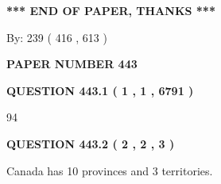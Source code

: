 \documentclass[12pt]{article}
\begin{document}
 
 
 
   
   
 \vspace{0.2in}
 
   
   
   
   
\vspace{1.0in} 
{\textbf{\large{ *** END OF PAPER, THANKS *** }}} 
   
   
\hspace{1.0in} By: 
 239 ( 416 ,  613 )
   
   
   
   
\newpage 
\setcounter{page}{ 
   443001 } 
   
   
   
   
 {\textbf{ \Large{ PAPER NUMBER  443  }}}
   
   
\vspace{0.2in}
   
   
   
   
   
   
 \vspace{0.2in}
 
 
 
 
   
   
  
\vspace{0.2in}
  
{\textbf{\Large{QUESTION
443.1 
 ( 1 , 1 , 6791 )
}}}
  
  
 
 
\noindent{}

94
 
 
  
\vspace{0.2in}
  
{\textbf{\Large{QUESTION
443.2 
 ( 2 , 2 , 3 )
}}}
  
  
 
 
\noindent{}
 
 
Canada has 10  provinces and 3 territories.
 
 
 
 
   
   
 \vspace{0.2in}
 
   
   
\end{document}
